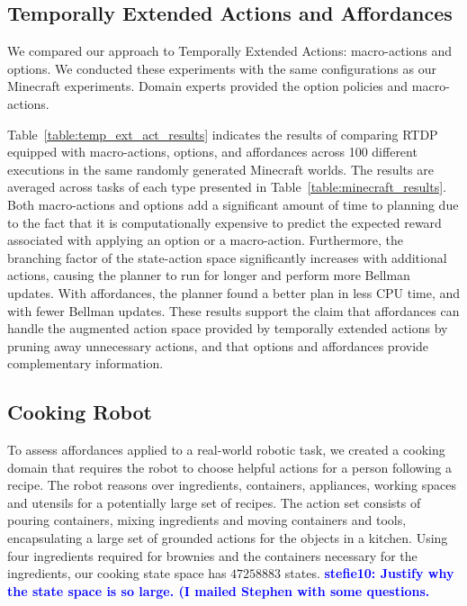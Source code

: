 \documentclass[letterpaper]{article}
\newcommand{\stnote}[1]{\textcolor{Blue}{\textbf{stefie10: #1}}}
\begin{document}
\subsection{Temporally Extended Actions and Affordances}

We compared our approach to Temporally Extended Actions: macro-actions
and options. We conducted these experiments with the same
configurations as our Minecraft experiments. Domain experts provided
the option policies and macro-actions.

Table~\ref{table:temp_ext_act_results} indicates the results of
comparing RTDP equipped with macro-actions, options, and affordances
across 100 different executions in the same randomly generated
Minecraft worlds. The results are averaged across tasks of each type
presented in Table~\ref{table:minecraft_results}. Both macro-actions
and options add a significant amount of time to planning due to the fact that
it is computationally expensive to predict the
expected reward associated with applying an option or a
macro-action. Furthermore, the branching factor of the state-action
space significantly increases with additional actions,
causing the planner to run for longer and perform more Bellman
updates. With affordances, the planner found a better plan in less CPU
time, and with fewer Bellman updates. These results support the claim
that affordances can handle the augmented action space provided by
temporally extended actions by pruning away unnecessary actions, and
that options and affordances provide complementary information.

\subsection{Cooking Robot}

To assess affordances applied to a real-world robotic task, we created
a cooking domain that requires the robot to choose helpful actions for
a person following a recipe.  The robot reasons over ingredients,
containers, appliances, working spaces and utensils for a potentially
large set of recipes. The action set consists of pouring containers,
mixing ingredients and moving containers and tools, encapsulating a
large set of grounded actions for the objects in a kitchen.  Using
four ingredients required for brownies and the containers necessary
for the ingredients, our cooking state space has
$\num[round-precision=3, round-mode=figures]{47258883}$ states.
\stnote{Justify why the state space is so large.  (I mailed Stephen with some questions.}
\end{document}
